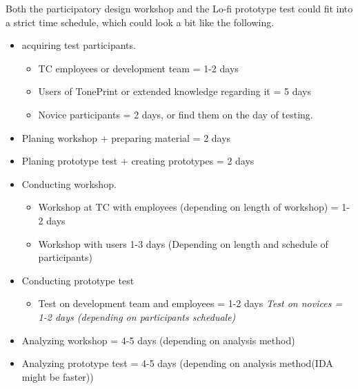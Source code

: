 \noindent
Both the participatory design workshop and the Lo-fi prototype test could fit into a strict time schedule, which could look a bit like the following. 
\begin{itemize}
    \item acquiring test participants.
    \begin{itemize}
        \item TC employees or development team = 1-2 days
        \item Users of TonePrint or extended knowledge regarding it = 5 days
        \item Novice participants = 2 days, or find them on the day of testing.
    \end{itemize}
    \item Planing workshop + preparing material = 2 days
    \item Planing prototype test + creating prototypes = 2 days
    \item Conducting workshop.
    \begin{itemize}
        \item Workshop at TC with employees (depending on length of workshop) = 1-2 days
        \item Workshop with users 1-3 days (Depending on length and schedule of participants)
    \end{itemize}
    \item Conducting prototype test
    \begin{itemize}
        \item Test on development team and employees = 1-2 days
        \it Test on novices = 1-2 days (depending on participants scheduale)
    \end{itemize}
    \item Analyzing workshop = 4-5 days (depending on analysis method)
    \item Analyzing prototype test = 4-5 days (depending on analysis method(IDA might be faster))
\end{itemize}



